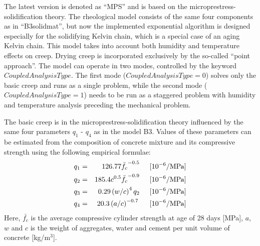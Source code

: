 \documentclass[a4paper]{article}
\begin{document}
The latest version is denoted as ``MPS'' and is based on the microprestress-solidification theory. The rheological model consists of the same four components as in  ``B3solidmat'', but now the implemented exponential algorithm is designed especially for the solidifying Kelvin chain, which is a special case of an aging Kelvin chain. This model takes into account both humidity and temperature effects on creep. Drying creep is incorporated exclusively by the so-called
``point approach''. The model can operate in two modes,
controlled by the keyword $CoupledAnalysisType$. The first mode ($CoupledAnalysisType = 0$) solves only the basic creep and runs as a single problem, while the second mode ($CoupledAnalysisType = 1$) needs to be run as a staggered problem with humidity and temperature analysis preceding the mechanical problem.

The basic creep is in the microprestress-solidification theory influenced by the same four parameters $q_1$ - $q_4$ as in the model B3. Values of these parameters can be estimated from the composition of concrete mixture and its compressive strength using the following empirical formulae: 
\begin{eqnarray}
  q_1 &=& 126.77 \bar{f_c}^{-0.5} \hspace{5 mm} [10^{-6}/\mbox {MPa}]\\
  q_2 &=& 185.4 c^{0.5} \bar{f_c}^{-0.9} \hspace{5 mm} [10^{-6}/\mbox {MPa}]\\
  q_3 &=& 0.29 \left(w/c\right)^4 q_2 \hspace{5 mm} [10^{-6}/\mbox {MPa}]\\
  q_4 &=& 20.3 \left(a/c\right)^{-0.7} \hspace{5 mm} [10^{-6}/\mbox {MPa}]  
\end{eqnarray}
Here, $\bar{f_c}$ is the average compressive cylinder strength at age of 28 days [MPa], $a$, $w$ and $c$ is the weight  of aggregates, water and cement per unit volume of concrete [kg/m$^3$].
\end{document}
